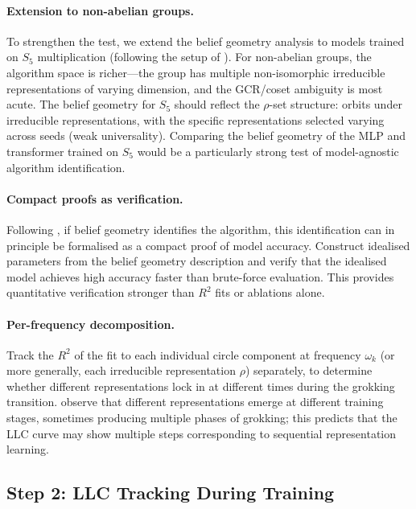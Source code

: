 \documentclass[11pt,a4paper]{article}
\begin{document}
\paragraph{Extension to non-abelian groups.} To strengthen the test, we extend the belief geometry analysis to models trained on $S_5$ multiplication (following the setup of \citet{chughtai2023toy, stander2024grokking, wu2024unified}). For non-abelian groups, the algorithm space is richer---the group has multiple non-isomorphic irreducible representations of varying dimension, and the GCR/coset ambiguity is most acute. The belief geometry for $S_5$ should reflect the $\rho$-set structure: orbits under irreducible representations, with the specific representations selected varying across seeds (weak universality). Comparing the belief geometry of the MLP and transformer trained on $S_5$ would be a particularly strong test of model-agnostic algorithm identification.

\paragraph{Compact proofs as verification.} Following \citet{wu2024unified}, if belief geometry identifies the algorithm, this identification can in principle be formalised as a compact proof of model accuracy. Construct idealised parameters from the belief geometry description and verify that the idealised model achieves high accuracy faster than brute-force evaluation. This provides quantitative verification stronger than $R^2$ fits or ablations alone.

\paragraph{Per-frequency decomposition.} Track the $R^2$ of the fit to each individual circle component at frequency $\omega_k$ (or more generally, each irreducible representation $\rho$) separately, to determine whether different representations lock in at different times during the grokking transition. \citet{chughtai2023toy} observe that different representations emerge at different training stages, sometimes producing multiple phases of grokking; this predicts that the LLC curve may show multiple steps corresponding to sequential representation learning.

\subsection{Step 2: LLC Tracking During Training}\label{sec:llc}
\end{document}
